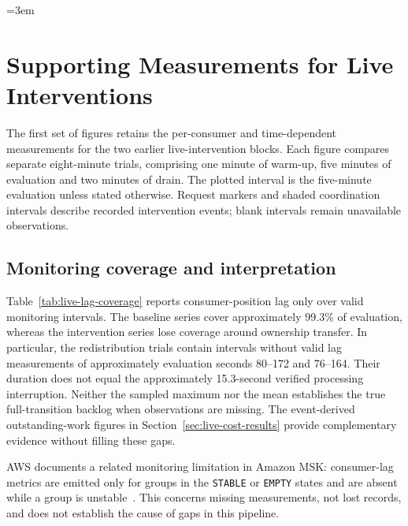 \documentclass[10pt]{article}
\begin{document}
\clearpage

\begingroup
\emergencystretch=3em
\clearpage
\section{Supporting Measurements for Live Interventions}
\label{app:live-diagnostics}

The first set of figures retains the per-consumer and time-dependent measurements for the two earlier live-intervention blocks. Each figure compares separate eight-minute trials, comprising one minute of warm-up, five minutes of evaluation and two minutes of drain. The plotted interval is the five-minute evaluation unless stated otherwise. Request markers and shaded coordination intervals describe recorded intervention events; blank intervals remain unavailable observations.

\subsection{Monitoring coverage and interpretation}
Table~\ref{tab:live-lag-coverage} reports consumer-position lag only over valid monitoring intervals. The baseline series cover approximately 99.3\% of evaluation, whereas the intervention series lose coverage around ownership transfer. In particular, the redistribution trials contain intervals without valid lag measurements of approximately evaluation seconds 80--172 and 76--164. Their duration does not equal the approximately 15.3-second verified processing interruption. Neither the sampled maximum nor the mean establishes the true full-transition backlog when observations are missing. The event-derived outstanding-work figures in Section~\ref{sec:live-cost-results} provide complementary evidence without filling these gaps.

AWS documents a related monitoring limitation in Amazon MSK: consumer-lag metrics are emitted only for groups in the \texttt{STABLE} or \texttt{EMPTY} states and are absent while a group is unstable~\cite{awsMskConsumerLag}. This concerns missing measurements, not lost records, and does not establish the cause of gaps in this pipeline.
\end{document}
